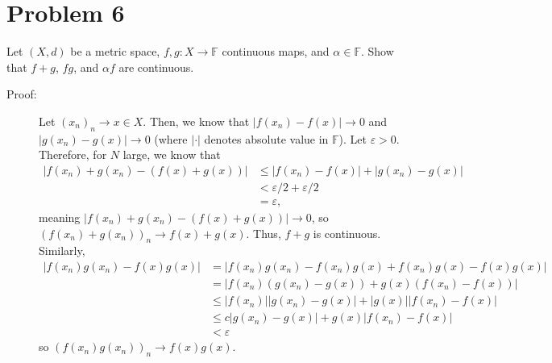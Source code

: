 \documentclass[8pt]{extarticle}
\begin{document}
  \section{Problem 6}%
  Let $(X,d)$ be a metric space, $f,g: X\rightarrow \mathbb{F}$ continuous maps, and $\alpha\in \mathbb{F}$. Show that $f+g$, $fg$, and $\alpha f$ are continuous.
  \begin{description}
    \item[Proof:] Let $(x_n)_n\rightarrow x\in X$. Then, we know that $|f(x_n)-f(x)| \rightarrow 0$ and $|g(x_n)-g(x)|\rightarrow 0$ (where $|\cdot|$ denotes absolute value in $\mathbb{F}$). Let $\varepsilon > 0$. Therefore, for $N$ large, we know that
      \begin{align*}
        |f(x_n) + g(x_n) - (f(x) + g(x))| &\leq |f(x_n) - f(x)| + |g(x_n)-g(x)|\\
                                          & < \varepsilon/2 + \varepsilon/2\\
                                          &= \varepsilon,
      \end{align*}
      meaning $|f(x_n) + g(x_n) - (f(x) + g(x))|\rightarrow 0$, so $(f(x_n) + g(x_n))_n\rightarrow f(x) + g(x)$. Thus, $f + g$ is continuous.\\

      Similarly,
      \begin{align*}
        |f(x_{n})g(x_n) - f(x)g(x)| &= |f(x_n)g(x_n) - f(x_n)g(x) + f(x_n)g(x) - f(x)g(x)|\\
                                    &= |f(x_n)(g(x_n)-g(x)) + g(x)(f(x_n)-f(x))|\\
                                    &\leq |f(x_n)||g(x_n)-g(x)| + |g(x)||f(x_n)-f(x)|\\
                                    &\leq c|g(x_n)-g(x)| + g(x)|f(x_n)-f(x)|\tag*{convergent sequences are bounded}\\
                                    &< \varepsilon
      \end{align*}
      so $(f(x_n)g(x_n))_n \rightarrow f(x)g(x)$.
  \end{description}
\end{document}
